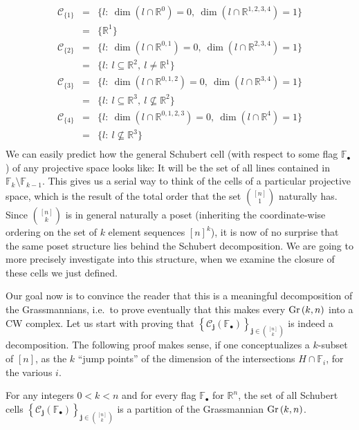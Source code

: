 \[\begin{array}{rcl}
\mathcal{C}_{\{1\}}&=&\big\{l:\ \dim(l\cap\mathbb{R}^{0})=0,\ \dim(l\cap\mathbb{R}^{1,2,3,4})=1\big\}\\
&=&\big\{\mathbb{R}^1\big\}\\[.6em]
\mathcal{C}_{\{2\}}&=&\big\{l:\ \dim(l\cap\mathbb{R}^{0,1})=0,\ \dim(l\cap\mathbb{R}^{2,3,4})=1\big\}\\
&=&\big\{l:\ l\subseteq\mathbb{R}^2,\ l\neq\mathbb{R}^1\big\}\\[.6em]
\mathcal{C}_{\{3\}}&=&\big\{l:\ \dim(l\cap\mathbb{R}^{0,1,2})=0,\ \dim(l\cap\mathbb{R}^{3,4})=1\big\}\\
&=&\big\{l:\ l\subseteq\mathbb{R}^3,\ l\not\subseteq\mathbb{R}^2\big\}\\[.6em]
\mathcal{C}_{\{4\}}&=&\big\{l:\ \dim(l\cap\mathbb{R}^{0,1,2,3})=0,\ \dim(l\cap\mathbb{R}^{4})=1\big\}\\
&=&\big\{l:\ l\not\subseteq\mathbb{R}^3\big\}\\[.6em]
\end{array}\]
We can easily predict how the general Schubert cell (with respect to some flag $\mathbb{F}_{\bullet}$) of any projective space looks like: It will be the set of all lines contained in $\mathbb{F}_k\setminus\mathbb{F}_{k-1}$. This gives us a serial way to think of the cells of a particular projective space, which is the result of the total order that the set $\binom{[n]}{1}$ naturally has. Since $\binom{[n]}{k}$ is in general naturally a poset (inheriting the coordinate-wise ordering on the set of $k$ element sequences ${[n]}^k$), it is now of no surprise that the same poset structure lies behind the Schubert decomposition. We are going to more precisely investigate into this structure, when we examine the closure of these cells we just defined.

Our goal now is to convince the reader that this is a meaningful decomposition of the Grassmannians, i.e.\ to prove eventually that this makes every $\Gr{k}{n}$ into a CW complex. Let us start with proving that ${\left\{\mathcal{C}_{\mathbf{j}}(\mathbb{F}_{\bullet})\right\}}_{\mathbf{j}\in\binom{[n]}{k}}$ is indeed a decomposition. The following proof makes sense, if one conceptualizes a $k$-subset of $[n]$, as the $k$ ``jump points'' of the dimension of the intersections $H\cap\mathbb{F}_i$, for the various $i$.

\begin{lemma} For any integers $0<k<n$ and for every flag $\mathbb{F}_{\bullet}$ for $\mathbb{R}^n$, the set of all Schubert cells ${\left\{\mathcal{C}_{\mathbf{j}}(\mathbb{F}_{\bullet})\right\}}_{\mathbf{j}\in\binom{[n]}{k}}$ is a partition of the Grassmannian $\Gr{k}{n}$.
\end{lemma}


